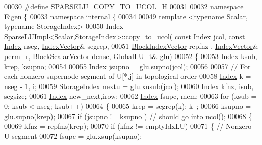 \begin{DoxyCode}
00030 \textcolor{preprocessor}{#define SPARSELU\_COPY\_TO\_UCOL\_H}
00031 
00032 \textcolor{keyword}{namespace }\hyperlink{namespace_eigen}{Eigen} \{
00033 \textcolor{keyword}{namespace }\hyperlink{namespaceinternal}{internal} \{
00034 
00049 \textcolor{keyword}{template} <\textcolor{keyword}{typename} Scalar, \textcolor{keyword}{typename} StorageIndex>
\hyperlink{group___sparse_l_u___module_ae4867ed1d5f104f9245411c356416a21}{00050} \hyperlink{namespace_eigen_a62e77e0933482dafde8fe197d9a2cfde}{Index} \hyperlink{group___sparse_l_u___module_ae4867ed1d5f104f9245411c356416a21}{SparseLUImpl<Scalar,StorageIndex>::copy\_to\_ucol}(\textcolor{keyword}{
      const} \hyperlink{namespace_eigen_a62e77e0933482dafde8fe197d9a2cfde}{Index} jcol, \textcolor{keyword}{const} \hyperlink{namespace_eigen_a62e77e0933482dafde8fe197d9a2cfde}{Index} nseg, \hyperlink{group___core___module_class_eigen_1_1_matrix}{IndexVector}& segrep,
00051                                                       \hyperlink{group___core___module_class_eigen_1_1_ref}{BlockIndexVector} repfnz ,
      \hyperlink{group___core___module_class_eigen_1_1_matrix}{IndexVector}& perm\_r, \hyperlink{group___core___module_class_eigen_1_1_ref}{BlockScalarVector} dense, 
      \hyperlink{struct_eigen_1_1internal_1_1_l_u___global_l_u__t}{GlobalLU\_t}& glu)
00052 \{  
00053   \hyperlink{namespace_eigen_a62e77e0933482dafde8fe197d9a2cfde}{Index} ksub, krep, ksupno; 
00054     
00055   \hyperlink{namespace_eigen_a62e77e0933482dafde8fe197d9a2cfde}{Index} jsupno = glu.supno(jcol);
00056   
00057   \textcolor{comment}{// For each nonzero supernode segment of U[*,j] in topological order }
00058   \hyperlink{namespace_eigen_a62e77e0933482dafde8fe197d9a2cfde}{Index} k = nseg - 1, i; 
00059   StorageIndex nextu = glu.xusub(jcol); 
00060   \hyperlink{namespace_eigen_a62e77e0933482dafde8fe197d9a2cfde}{Index} kfnz, isub, segsize; 
00061   \hyperlink{namespace_eigen_a62e77e0933482dafde8fe197d9a2cfde}{Index} new\_next,irow; 
00062   \hyperlink{namespace_eigen_a62e77e0933482dafde8fe197d9a2cfde}{Index} fsupc, mem; 
00063   \textcolor{keywordflow}{for} (ksub = 0; ksub < nseg; ksub++)
00064   \{
00065     krep = segrep(k); k--; 
00066     ksupno = glu.supno(krep); 
00067     \textcolor{keywordflow}{if} (jsupno != ksupno ) \textcolor{comment}{// should go into ucol(); }
00068     \{
00069       kfnz = repfnz(krep); 
00070       \textcolor{keywordflow}{if} (kfnz != emptyIdxLU)
00071       \{ \textcolor{comment}{// Nonzero U-segment }
00072         fsupc = glu.xsup(ksupno); 

\end{DoxyCode}
